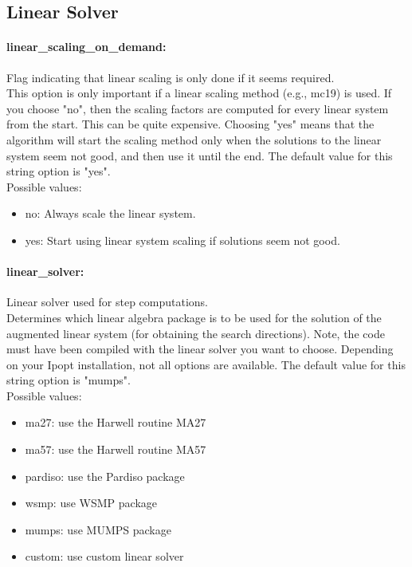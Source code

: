 \subsection{Linear Solver}
\label{sec:Linear_Solver}
\paragraph{linear\_scaling\_on\_demand:}\label{sec:linear_scaling_on_demand} Flag indicating that linear scaling is only done if it seems required. $\;$ \\
 This option is only important if a linear scaling
method (e.g., mc19) is used.  If you choose "no",
then the scaling factors are computed for every
linear system from the start.  This can be quite
expensive. Choosing "yes" means that the
algorithm will start the scaling method only when
the solutions to the linear system seem not good,
and then use it until the end.
The default value for this string option is "yes".
\\ 
Possible values:
\begin{itemize}
   \item no: Always scale the linear system.
   \item yes: Start using linear system scaling if solutions
seem not good.
\end{itemize}

\paragraph{linear\_solver:}\label{sec:linear_solver} Linear solver used for step computations. $\;$ \\
 Determines which linear algebra package is to be
used for the solution of the augmented linear
system (for obtaining the search directions).
Note, the code must have been compiled with the
linear solver you want to choose. Depending on
your Ipopt installation, not all options are
available.
The default value for this string option is "mumps".
\\ 
Possible values:
\begin{itemize}
   \item ma27: use the Harwell routine MA27
   \item ma57: use the Harwell routine MA57
   \item pardiso: use the Pardiso package
   \item wsmp: use WSMP package
   \item mumps: use MUMPS package
   \item custom: use custom linear solver
\end{itemize}

